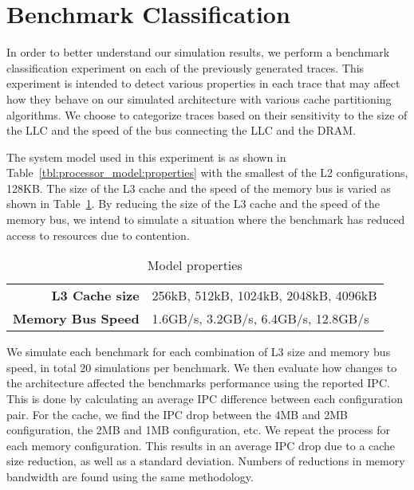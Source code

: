 \section{Benchmark Classification}



In order to better understand our simulation results, we perform a benchmark classification experiment on each of the previously generated traces.
This experiment is intended to detect various properties in each trace that may affect how they behave on our simulated architecture with various cache partitioning algorithms.
We choose to categorize traces based on their sensitivity to the size of the LLC and the speed of the bus connecting the LLC and the DRAM.

The system model used in this experiment is as shown in Table~\ref{tbl:processor_model:properties} with the smallest of the L2 configurations, 128KB.
The size of the L3 cache and the speed of the memory bus is varied as shown in Table~\ref{tbl:benchmarks_workloads:classification_model}.
By reducing the size of the L3 cache and the speed of the memory bus, we intend to simulate a situation where the benchmark has reduced access to resources due to contention.

\begin{table}[ht]
\centering
\begin{tabular}{rl}
\toprule
\bf{L3 Cache size} & 256kB, 512kB, 1024kB, 2048kB, 4096kB \\
\bf{Memory Bus Speed}   & 1.6GB/s, 3.2GB/s, 6.4GB/s, 12.8GB/s \\
\bottomrule                             
\end{tabular}
\caption{Model properties}
\label{tbl:benchmarks_workloads:classification_model}
\end{table}

We simulate each benchmark for each combination of L3 size and memory bus speed, in total 20 simulations per benchmark.
We then evaluate how changes to the architecture affected the benchmarks performance using the reported IPC.
This is done by calculating an average IPC difference between each configuration pair.
For the cache, we find the IPC drop between the 4MB and 2MB configuration, the 2MB and 1MB configuration, etc.
We repeat the process for each memory configuration.
This results in an average IPC drop due to a cache size reduction, as well as a standard deviation.
Numbers of reductions in memory bandwidth are found using the same methodology.

